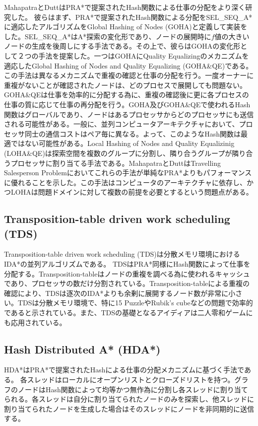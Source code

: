 \documentclass{jsarticle}
\begin{document}
MahapatraとDuttはPRA*で提案されたHash関数による仕事の分配をより深く研究した\cite{mahapatra1997scalable}。
彼らはまず、PRA*で提案されたHash関数による分配をSEL\_SEQ\_A*に適応したアルゴリズムをGlobal Hashing of Nodes (GOHA)と定義して実装をした。SEL\_SEQ\_A*はA*探索の変化形であり、ノードの展開時に$f$値の大きいノードの生成を後周しにする手法である。その上で、彼らはGOHAの変化形として２つの手法を提案した。一つはGOHAにQuality Equalizingのメカニズムを適応したGlobal Hashing of Nodes and Quality Equalizing (GOHA\&QE)である。この手法は異なるメカニズムで重複の確認と仕事の分配を行う。一度オーナーに重複がないことが確認されたノードは、どのプロセスで展開しても問題ない。GOHA\&QEは仕事を効率的に分配する為に、重複の確認後に更に各プロセスの仕事の質に応じて仕事の再分配を行う。GOHA及びGOHA\&QEで使われるHash関数はグローバルであり、ノードはあるプロセッサからどのプロセッサにも送信される可能性がある。一般に、並列コンピュータアーキテクチャにおいて、プロセッサ同士の通信コストはペア毎に異なる。よって、このようなHash関数は最適ではない可能性がある。Local Hashing of Nodes and Quality Equalizinig (LOHA\&QE)は探索空間を複数のグループに分割し、隣り合うグループが隣り合うプロセッサに割り当てる手法である。MahapatraとDuttはTravelling Salesperson Problemにおいてこれらの手法が単純なPRA*よりもパフォーマンスに優れることを示した。この手法はコンピュータのアーキテクチャに依存し、かつLOHAは問題ドメインに対して複数の前提を必要とするという問題点がある。

\subsection{Transposition-table driven work scheduling (TDS)}
Transposition-table driven work scheduling (TDS)は分散メモリ環境におけるIDA*の並列アルゴリズムである\cite{romein1999transposition}。
TDSはPRA*同様にHash関数によって仕事を分配する。Transposition-tableはノードの重複を調べる為に使われるキャッシュであり、プロセッサの数だけ分割されている。Transposition-tableによる重複の確認により、TDSは逐次のIDA*よりも余剰に展開するノード数が非常に小さい。TDSは分散メモリ環境で、特に15 PuzzleやRubik's cubeなどの問題で効率的であると示されている。また、TDSの基礎となるアイディアは二人零和ゲームにも応用されている。


\subsection{Hash Distributed A* (HDA*)}
HDA*はPRA*で提案されたHashによる仕事の分配メカニズムに基づく手法である。
各スレッドはローカルにオープンリストとクローズドリストを持つ。グラフのノードはHash関数によって均等かつ無作為に分割し各スレッドに割り当てられる。各スレッドは自分に割り当てられたノードのみを探索し、他スレッドに割り当てられたノードを生成した場合はそのスレッドにノードを非同期的に送信する。
\end{document}
